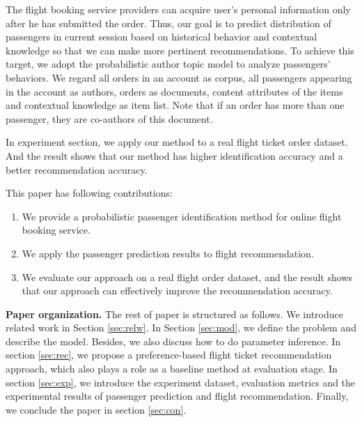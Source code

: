 \documentclass{llncs}
\begin{document}
 The flight booking service providers can acquire user's personal information only after he has submitted the order. Thus, our goal is to predict distribution of passengers in current session based on historical behavior and contextual knowledge so that we can make more pertinent recommendations. To achieve this target, we adopt the probabilistic author topic model to analyze passengers' behaviors. We regard all orders in an account as corpus, all passengers appearing in the account as authors, orders as documents, content attributes of the items and contextual knowledge as item list. Note that if an order has more than one passenger, they are co-authors of this document.\par
 In experiment section, we apply our method to a real flight ticket order dataset.  And the result shows that our method has higher identification accuracy and a better recommendation accuracy.\par
 This paper has following contributions:\\
\begin{enumerate}
\item We provide a probabilistic passenger identification method for online flight booking service.
\item We apply the passenger prediction results to flight recommendation.
\item We evaluate our approach on a real flight order dataset, and the result shows that our approach can effectively improve the recommendation accuracy.
\end{enumerate}

\textbf{Paper organization.} The rest of paper is structured as follows. We introduce related work in Section \ref{sec:relw}. In Section \ref{sec:mod}, we define the problem and describe the model. Besides, we also discuss how to do parameter inference. In section \ref{sec:rec}, we propose a preference-based flight ticket recommendation approach, which also plays a role as a baseline method at evaluation stage. In section \ref{sec:exp}, we introduce the experiment dataset, evaluation metrics and the experimental results of passenger prediction and flight recommendation. Finally, we conclude the paper in section \ref{sec:con}.
\end{document}
